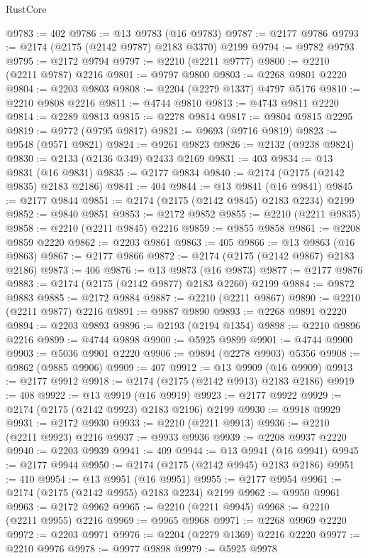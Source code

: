 \begin{lexlean}{RustCore}
\begin{coremodule}
@9783 := 402
@9786 := @13 @9783 (@16 @9783)
@9787 := @2177 @9786
@9793 := @2174 (@2175 (@2142 @9787) @2183 @3370) @2199
@9794 := @9782 @9793
@9795 := @2172 @9794
@9797 := @2210 (@2211 @9777)
@9800 := @2210 (@2211 @9787) @2216
@9801 := @9797 @9800
@9803 := @2268 @9801 @2220
@9804 := @2203 @9803
@9808 := @2204 (@2279 @1337) @4797 @5176
@9810 := @2210 @9808 @2216
@9811 := @4744 @9810
@9813 := @4743 @9811 @2220
@9814 := @2289 @9813
@9815 := @2278 @9814
@9817 := @9804 @9815 @2295
@9819 := @9772 (@9795 @9817)
@9821 := @9693 (@9716 @9819)
@9823 := @9548 (@9571 @9821)
@9824 := @9261 @9823
@9826 := @2132 (@9238 @9824)
@9830 := @2133 (@2136 @349) @2433 @2169
@9831 := 403
@9834 := @13 @9831 (@16 @9831)
@9835 := @2177 @9834
@9840 := @2174 (@2175 (@2142 @9835) @2183 @2186)
@9841 := 404
@9844 := @13 @9841 (@16 @9841)
@9845 := @2177 @9844
@9851 := @2174 (@2175 (@2142 @9845) @2183 @2234) @2199
@9852 := @9840 @9851
@9853 := @2172 @9852
@9855 := @2210 (@2211 @9835)
@9858 := @2210 (@2211 @9845) @2216
@9859 := @9855 @9858
@9861 := @2208 @9859 @2220
@9862 := @2203 @9861
@9863 := 405
@9866 := @13 @9863 (@16 @9863)
@9867 := @2177 @9866
@9872 := @2174 (@2175 (@2142 @9867) @2183 @2186)
@9873 := 406
@9876 := @13 @9873 (@16 @9873)
@9877 := @2177 @9876
@9883 := @2174 (@2175 (@2142 @9877) @2183 @2260) @2199
@9884 := @9872 @9883
@9885 := @2172 @9884
@9887 := @2210 (@2211 @9867)
@9890 := @2210 (@2211 @9877) @2216
@9891 := @9887 @9890
@9893 := @2268 @9891 @2220
@9894 := @2203 @9893
@9896 := @2193 (@2194 @1354)
@9898 := @2210 @9896 @2216
@9899 := @4744 @9898
@9900 := @5925 @9899
@9901 := @4744 @9900
@9903 := @5036 @9901 @2220
@9906 := @9894 (@2278 @9903) @5356
@9908 := @9862 (@9885 @9906)
@9909 := 407
@9912 := @13 @9909 (@16 @9909)
@9913 := @2177 @9912
@9918 := @2174 (@2175 (@2142 @9913) @2183 @2186)
@9919 := 408
@9922 := @13 @9919 (@16 @9919)
@9923 := @2177 @9922
@9929 := @2174 (@2175 (@2142 @9923) @2183 @2196) @2199
@9930 := @9918 @9929
@9931 := @2172 @9930
@9933 := @2210 (@2211 @9913)
@9936 := @2210 (@2211 @9923) @2216
@9937 := @9933 @9936
@9939 := @2208 @9937 @2220
@9940 := @2203 @9939
@9941 := 409
@9944 := @13 @9941 (@16 @9941)
@9945 := @2177 @9944
@9950 := @2174 (@2175 (@2142 @9945) @2183 @2186)
@9951 := 410
@9954 := @13 @9951 (@16 @9951)
@9955 := @2177 @9954
@9961 := @2174 (@2175 (@2142 @9955) @2183 @2234) @2199
@9962 := @9950 @9961
@9963 := @2172 @9962
@9965 := @2210 (@2211 @9945)
@9968 := @2210 (@2211 @9955) @2216
@9969 := @9965 @9968
@9971 := @2268 @9969 @2220
@9972 := @2203 @9971
@9976 := @2204 (@2279 @1369) @2216 @2220
@9977 := @2210 @9976
@9978 := @9977 @9898
@9979 := @5925 @9978

\end{coremodule}
\end{lexlean}
